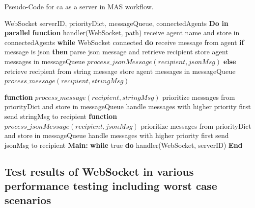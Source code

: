 \begin{breakablealgorithm}
    \caption{Pseudo-Code for \gls{ca} as a server in MAS workflow.}
    \label{alg: ServerPseudoCode}
    \begin{algorithmic}[1]
         WebSocket
         serverID, priorityDict, messageQueue, connectedAgents
        \State \textbf{Do in parallel}
        \State \textbf{\qquad function} handler(WebSocket, path)  
        \State \textbf \qquad \qquad receive agent name and store in connectedAgents
        \State \textbf {\qquad \qquad while} WebSocket connected \textbf{do} 
        \State \textbf \qquad \qquad \qquad receive message from agent   
        \State \textbf{\qquad \qquad \qquad if} {message is json} \textbf{then}
        \State \textbf \qquad \qquad \qquad \qquad parse json message and retrieve recipient
        \State \textbf \qquad \qquad \qquad \qquad store agent messages in messageQueue  
        \State \textbf \qquad \qquad \qquad \qquad $process\_jsonMessage(recipient, jsonMsg)$
        \State \textbf{\qquad \qquad \qquad else}  
        \State \textbf \qquad \qquad \qquad \qquad retrieve recipient from string message
        \State \textbf \qquad \qquad \qquad \qquad store agent messages in messageQueue  
        \State \textbf \qquad \qquad \qquad \qquad $process\_message(recipient, stringMsg)$
        
        \State \textbf{\qquad function} $process\_message(recipient, stringMsg)$   
        \State \textbf \qquad \qquad prioritize messages from priorityDict and store in messageQueue 
        \State \textbf \qquad \qquad handle messages with higher priority first   
        \State \textbf \qquad \qquad send stringMsg to recipient 
        \State \textbf{\qquad function} $process\_jsonMessage(recipient, jsonMsg)$   
        \State \textbf \qquad \qquad prioritize messages from priorityDict and store in messageQueue
        \State \textbf \qquad \qquad handle messages with higher priority first 
        \State \textbf \qquad \qquad send jsonMsg to recipient
        \State \textbf{Main:}   
        \State \textbf {\qquad while} true \textbf {do}
        \State \textbf \qquad \qquad handler(WebSocket, serverID) 
        \State \textbf{End}                 
    \end{algorithmic}
\end{breakablealgorithm}




\subsection{Test results of WebSocket in various performance testing including worst case scenarios} \label{chap: Result-WS}


